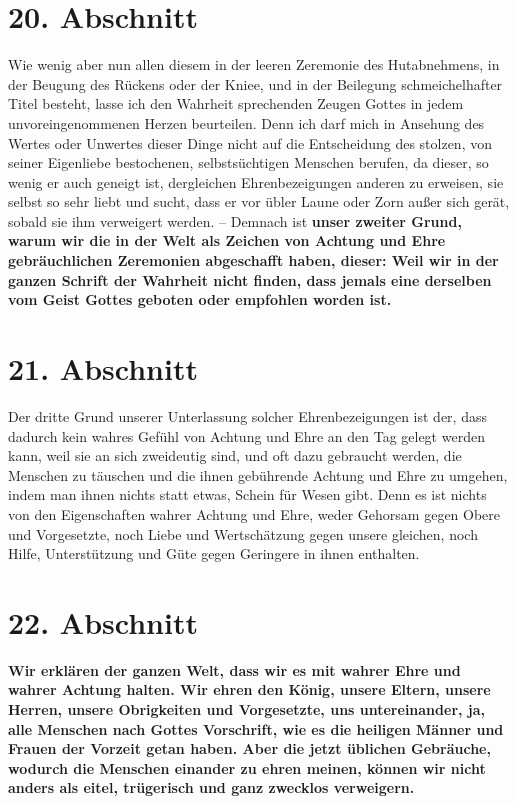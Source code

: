 \section{20. Abschnitt} \label{kap9_ab20}

Wie wenig aber nun allen diesem in der leeren Zeremonie des Hutabnehmens, in
der Beugung des Rückens oder der Kniee, und in der Beilegung schmeichelhafter
Titel besteht, lasse ich den Wahrheit sprechenden Zeugen Gottes in jedem
unvoreingenommenen Herzen beurteilen. Denn ich darf mich in Ansehung des Wertes
oder Unwertes dieser Dinge nicht auf die Entscheidung des stolzen, von seiner
Eigenliebe bestochenen, selbstsüchtigen Menschen berufen, da dieser, so wenig er
auch geneigt ist, dergleichen Ehrenbezeigungen anderen zu erweisen, sie selbst
so
sehr liebt und sucht, dass er vor übler Laune oder Zorn außer sich gerät, sobald
sie ihm verweigert werden. -- Demnach ist \label{ref:09_20_zeiter_grund}
\textbf{unser zweiter Grund, warum wir die in
der Welt als Zeichen von Achtung und Ehre gebräuchlichen Zeremonien abgeschafft
haben, dieser: Weil wir in der ganzen Schrift der Wahrheit nicht finden, dass
jemals eine derselben vom Geist Gottes geboten oder empfohlen worden ist.}

\section{21. Abschnitt} \label{kap9_ab21}

Der dritte Grund unserer Unterlassung solcher Ehrenbezeigungen ist der, dass
dadurch kein wahres Gefühl von Achtung und Ehre an den Tag gelegt werden kann,
weil sie an sich zweideutig sind, und oft dazu gebraucht werden, die Menschen zu
täuschen und die ihnen gebührende Achtung und Ehre zu umgehen, indem man ihnen
nichts statt etwas, Schein für Wesen gibt. Denn es ist nichts von den
Eigenschaften wahrer Achtung und Ehre, weder Gehorsam gegen Obere und
Vorgesetzte, noch Liebe und Wertschätzung gegen unsere gleichen, noch Hilfe,
Unterstützung und Güte gegen Geringere in ihnen enthalten.

\section{22. Abschnitt} \label{kap9_ab22}

\label{ref:09_20_koenig} \textbf{Wir erklären der ganzen Welt, dass wir
es mit wahrer Ehre und wahrer Achtung
halten. Wir ehren den König, unsere Eltern,
unsere Herren, unsere Obrigkeiten
und Vorgesetzte, uns untereinander, ja, alle
Menschen nach Gottes Vorschrift,
wie es die heiligen Männer und Frauen der Vorzeit getan haben. Aber die jetzt
üblichen Gebräuche, wodurch die Menschen einander zu ehren meinen, können wir
nicht anders als eitel, trügerisch und ganz zwecklos verweigern.}

